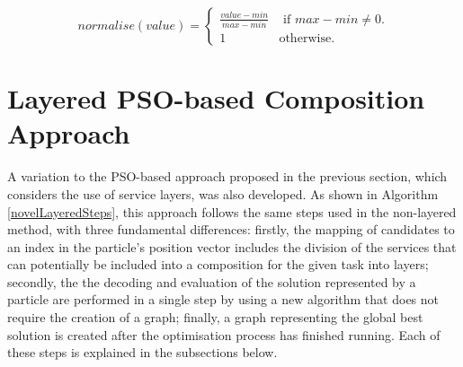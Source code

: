\documentclass{llncs}
\begin{document}
\begin{equation}
normalise(value) = 
\begin{cases}
	\frac{value - min}{max - min} & \text{ if }max - min \neq 0.\\
	1 & \mathrm{ otherwise}.
\end{cases}
\end{equation}

\section{Layered PSO-based Composition Approach}\label{layered_pso_approach}

A variation to the PSO-based approach proposed in the previous section, which considers the use of service layers, was also developed. As shown in Algorithm \ref{novelLayeredSteps}, this approach follows the same steps used in the non-layered method, with three fundamental differences: firstly, the mapping of candidates to an index in the particle's position vector includes the division of the services that can potentially be included into a composition for the given task into layers; secondly, the the decoding and evaluation of the solution represented by a particle are performed in a single step by using a new algorithm that does not require the creation of a graph; finally, a graph representing the global best solution is created after the optimisation process has finished running. Each of these steps is explained in the subsections below.
\end{document}
